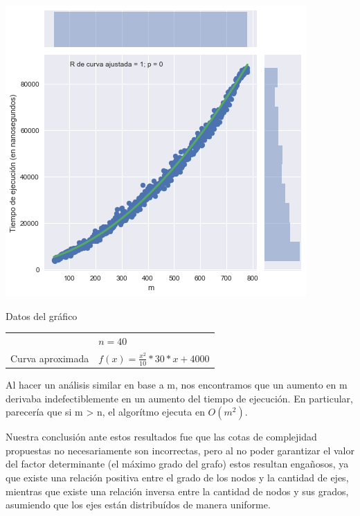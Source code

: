 \begin{minipage}{0.49\textwidth}
    \hfill
    \includegraphics[scale=0.55]{img/greedy-m-hi.png}

    \begin{center}
        Datos del gráfico

        \begin{tabular}{ | l l |}
            \hline
             & $n = 40$ \\
            Curva aproximada & $f(x) = \frac{x^2}{10} * 30 * x + 4000$ \\
            \hline
        \end{tabular}
    \end{center}
\end{minipage}

Al hacer un análisis similar en base a m, nos encontramos que un aumento en m derivaba indefectiblemente en un aumento del tiempo de ejecución. En particular, parecería que si m > n, el algorítmo ejecuta en $O(m^2)$.

Nuestra conclusión ante estos resultados fue que las cotas de complejidad propuestas no necesariamente son incorrectas, pero al no poder garantizar el valor del factor determinante (el máximo grado del grafo) estos resultan engañosos, ya que existe una relación positiva entre el grado de los nodos y la cantidad de ejes, mientras que existe una relación inversa entre la cantidad de nodos y sus grados, asumiendo que los ejes están distribuídos de manera uniforme.

